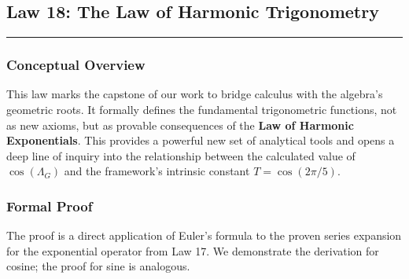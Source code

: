 \subsection*{Law 18: The Law of Harmonic Trigonometry}
\hrule
\vspace{0.3cm}
\vspace{0.5cm}

\subsubsection*{Conceptual Overview}
This law marks the capstone of our work to bridge calculus with the algebra's geometric roots. It formally defines the fundamental trigonometric functions, not as new axioms, but as provable consequences of the \textbf{Law of Harmonic Exponentials}. This provides a powerful new set of analytical tools and opens a deep line of inquiry into the relationship between the calculated value of $\cos(\Lambda_G)$ and the framework's intrinsic constant $T = \cos(2\pi/5)$.

\subsubsection*{Formal Proof}
The proof is a direct application of Euler's formula to the proven series expansion for the exponential operator from Law 17. We demonstrate the derivation for cosine; the proof for sine is analogous.


